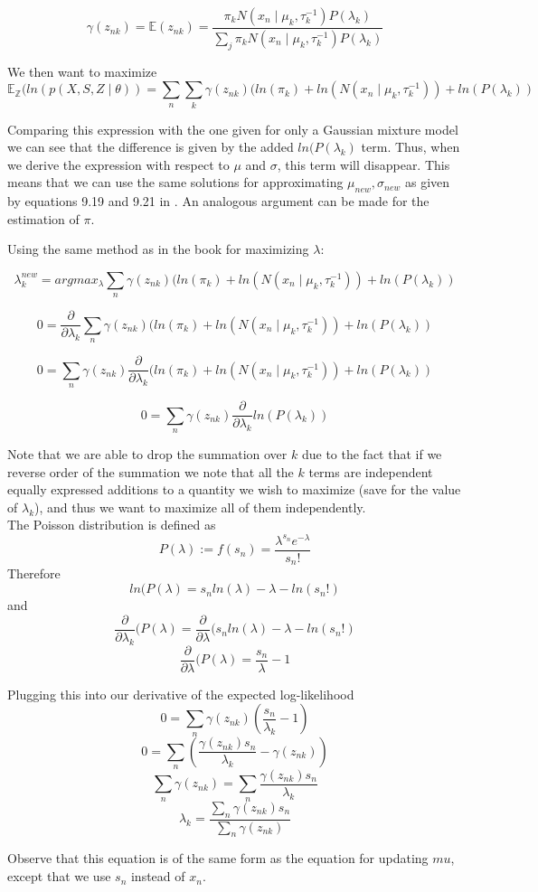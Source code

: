 \documentclass[11pt,a4paper]{article}
\begin{document}
$$\gamma(z_{nk}) = \mathbb{E}(z_{nk}) = \frac{\pi_{k}N(x_{n} \mid \mu_{k}, \tau_{k}^{-1})P(\lambda_{k})}{\sum_{j}\pi_{k}N(x_{n} \mid \mu_{k}, \tau_{k}^{-1})P(\lambda_{k})}$$

We then want to maximize $$ \mathbb{E_{Z}}(ln(p(X, S, Z \mid \theta)) = \sum_{n} \sum_{k}\gamma(z_{nk})(ln(\pi_{k}) + ln(N(x_{n} \mid \mu_{k}, \tau_{k}^{-1})) + ln(P(\lambda_{k}))$$

Comparing this expression with the one given for only a Gaussian mixture model we can see that the difference is given by the added $ln(P(\lambda_{k})$ term. Thus, when we derive the expression with respect to $\mu$ and $\sigma$, this term will disappear. This means that we can use the same solutions for approximating $\mu_{new}, \sigma_{new}$ as given by equations 9.19 and 9.21 in \cite{book}. An analogous argument can be made for the estimation of $\pi$.

Using the same method as in the book for maximizing $\lambda$:


$$ \lambda_{k}^{new} =argmax_{\lambda} \sum_{n} \gamma(z_{nk})(ln(\pi_{k}) + ln(N(x_{n} \mid \mu_{k}, \tau_{k}^{-1})) + ln(P(\lambda_{k}))$$

$$ 0 = \frac{\partial}{\partial \lambda_{k}}\sum_{n} \gamma(z_{nk})(ln(\pi_{k}) + ln(N(x_{n} \mid \mu_{k}, \tau_{k}^{-1})) + ln(P(\lambda_{k}))$$

$$ 0 = \sum_{n} \gamma(z_{nk})\frac{\partial}{\partial \lambda_{k}}(ln(\pi_{k}) + ln(N(x_{n} \mid \mu_{k}, \tau_{k}^{-1})) + ln(P(\lambda_{k}))$$

$$ 0 = \sum_{n} \gamma(z_{nk})\frac{\partial}{\partial \lambda_{k}}ln(P(\lambda_{k}))$$

Note that we are able to drop the summation over $k$ due to the fact that if we reverse order of the summation we note that all the $k$ terms are independent equally expressed additions to a quantity we wish to maximize (save for the value of $\lambda_{k}$), and thus we want to maximize all of them independently.\\

The Poisson distribution is defined as
$$ P(\lambda) := f(s_{n}) = \frac{\lambda^{s_{n}}e^{-\lambda}}{s_{n}!} $$
Therefore
$$ln(P(\lambda) = s_{n}ln(\lambda) - \lambda - ln(s_{n}!)$$
and
$$\frac{\partial}{\partial \lambda_{k}}(P(\lambda) = \frac{\partial}{\partial \lambda}(s_{n}ln(\lambda) - \lambda - ln(s_{n}!)$$
$$\frac{\partial}{\partial \lambda}(P(\lambda) = \frac{s_{n}}{\lambda} - 1$$

Plugging this into our derivative of the expected log-likelihood
$$ 0 = \sum_{n} \gamma(z_{nk})(\frac{s_{n}}{\lambda_{k}} - 1)$$
$$ 0 = \sum_{n} (\frac{\gamma(z_{nk})s_{n}}{\lambda_{k}} - \gamma(z_{nk}))$$
$$ \sum_{n}\gamma(z_{nk}) = \sum_{n} \frac{\gamma(z_{nk})s_{n}}{\lambda_{k}} $$
$$ \lambda_{k} =  \frac{\sum_{n}\gamma(z_{nk})s_{n}}{\sum_{n}\gamma(z_{nk})} $$

Observe that this equation is of the same form as the equation for updating $mu$, except that we use $s_{n}$ instead of $x_{n}$.






\end{document}
